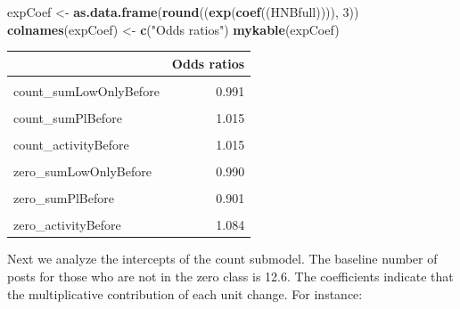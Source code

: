 \documentclass[10pt,]{scrartcl}
\newenvironment{Shaded}{\begin{snugshade}}{\end{snugshade}}
\newcommand{\KeywordTok}[1]{\textcolor[rgb]{0.13,0.29,0.53}{\textbf{#1}}}
\newcommand{\DecValTok}[1]{\textcolor[rgb]{0.00,0.00,0.81}{#1}}
\newcommand{\StringTok}[1]{\textcolor[rgb]{0.31,0.60,0.02}{#1}}
\newcommand{\NormalTok}[1]{#1}
\begin{document}
\footnotesize

\begin{Shaded}
\begin{Highlighting}[]
\NormalTok{expCoef <-}\StringTok{ }\KeywordTok{as.data.frame}\NormalTok{(}\KeywordTok{round}\NormalTok{((}\KeywordTok{exp}\NormalTok{(}\KeywordTok{coef}\NormalTok{((HNBfull)))), }\DecValTok{3}\NormalTok{))}
\KeywordTok{colnames}\NormalTok{(expCoef) <-}\StringTok{ }\KeywordTok{c}\NormalTok{(}\StringTok{"Odds ratios"}\NormalTok{)}
\KeywordTok{mykable}\NormalTok{(expCoef)}
\end{Highlighting}
\end{Shaded}

\begin{table}
\centering\begingroup\fontsize{9}{11}\selectfont

\begin{tabular}{lr}
\toprule
  & Odds ratios\\
\midrule
\cellcolor{gray!6}{count\_(Intercept)} & \cellcolor{gray!6}{12.606}\\
count\_sumLowOnlyBefore & 0.991\\
\cellcolor{gray!6}{count\_sumHighBefore} & \cellcolor{gray!6}{0.992}\\
count\_sumPlBefore & 1.015\\
\cellcolor{gray!6}{count\_sumPhBefore} & \cellcolor{gray!6}{0.870}\\
\addlinespace
count\_activityBefore & 1.015\\
\cellcolor{gray!6}{zero\_(Intercept)} & \cellcolor{gray!6}{1.634}\\
zero\_sumLowOnlyBefore & 0.990\\
\cellcolor{gray!6}{zero\_sumHighBefore} & \cellcolor{gray!6}{0.894}\\
zero\_sumPlBefore & 0.901\\
\addlinespace
\cellcolor{gray!6}{zero\_sumPhBefore} & \cellcolor{gray!6}{1.156}\\
zero\_activityBefore & 1.084\\
\bottomrule
\end{tabular}
\endgroup{}
\end{table}

\normalsize

Next we analyze the intercepts of the count submodel. The baseline
number of posts for those who are not in the zero class is 12.6. The
coefficients indicate that the multiplicative contribution of each unit
change. For instance:
\end{document}
